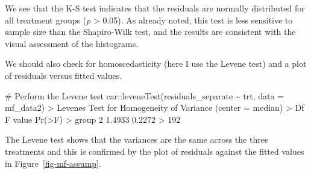 \documentclass[
  letterpaper,
]{book}
\newenvironment{Shaded}{\begin{snugshade}}{\end{snugshade}}
\newcommand{\AttributeTok}[1]{\textcolor[rgb]{0.40,0.45,0.13}{#1}}
\newcommand{\CommentTok}[1]{\textcolor[rgb]{0.37,0.37,0.37}{#1}}
\newcommand{\FunctionTok}[1]{\textcolor[rgb]{0.28,0.35,0.67}{#1}}
\newcommand{\NormalTok}[1]{\textcolor[rgb]{0.00,0.23,0.31}{#1}}
\newcommand{\SpecialCharTok}[1]{\textcolor[rgb]{0.37,0.37,0.37}{#1}}
\newcommand{\StringTok}[1]{\textcolor[rgb]{0.13,0.47,0.30}{#1}}
\begin{document}
We see that the K-S test indicates that the residuals are normally
distributed for all treatment groups (\emph{p} \textgreater{} 0.05). As
already noted, this test is less sensitive to sample size than the
Shapiro-Wilk test, and the results are consistent with the visual
assessment of the histograms.

We should also check for homoscedasticity (here I use the Levene test)
and a plot of residuals versus fitted values.

\begin{Shaded}
\begin{Highlighting}[]
\CommentTok{\# Perform the Levene test}
\NormalTok{car}\SpecialCharTok{::}\FunctionTok{leveneTest}\NormalTok{(residuals\_separate }\SpecialCharTok{\textasciitilde{}}\NormalTok{ trt, }\AttributeTok{data =}\NormalTok{ mf\_data2)}
\SpecialCharTok{\textgreater{}}\NormalTok{ Levene}\StringTok{\textquotesingle{}s Test for Homogeneity of Variance (center = median)}
\StringTok{\textgreater{}        Df F value Pr(\textgreater{}F)}
\StringTok{\textgreater{} group   2  1.4933 0.2272}
\StringTok{\textgreater{}       192}
\end{Highlighting}
\end{Shaded}

The Levene test shows that the variances are the same across the three
treatments and this is confirmed by the plot of residuals against the
fitted values in Figure~\ref{fig-mf-assump}.
\end{document}
